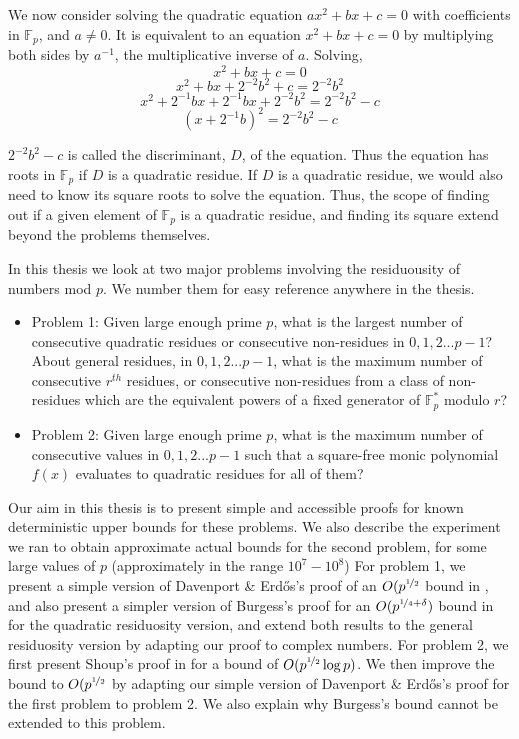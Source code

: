 \documentclass{report}
\begin{document}
We now consider solving the quadratic equation $ax^2+bx+c=0$ with coefficients in $\mathbb{F}_p$, and $a\neq 0$. It is equivalent to an equation $x^2+bx+c=0$ by multiplying both sides by $a^{-1}$, the multiplicative inverse of $a$. Solving,
$$x^2+bx+c=0$$
$$x^2+bx+2^{-2}b^{2}+c=2^{-2}b^{2}$$
$$x^2+2^{-1}bx+2^{-1}bx+2^{-2}b^{2}=2^{-2}b^{2}-c$$
$$(x+2^{-1}b)^2=2^{-2}b^{2}-c$$

$2^{-2}b^{2}-c$ is called the discriminant, $D$, of the equation. Thus the equation has roots in $\mathbb{F}_p$ if $D$ is a quadratic residue. If $D$ is a quadratic residue, we would also need to know its square roots to solve the equation. Thus, the scope of finding out if a given element of $\mathbb{F}_p$ is a quadratic residue, and finding its square extend beyond the problems themselves.

In this thesis we look at two major problems involving the residuousity of numbers mod $p$. We number them for easy reference anywhere in the thesis.
\begin{itemize}
    \item Problem 1: Given large enough prime $p$, what is the largest number of consecutive quadratic residues or consecutive non-residues in $0,1,2...p-1$? About general residues, in $0,1,2...p-1$, what is the maximum number of consecutive $r^{th}$ residues, or consecutive non-residues from a class of non-residues which are the equivalent powers of a fixed generator of $\mathbb{F}^*_p$ modulo $r$?
    \item Problem 2: Given large enough prime $p$, what is the maximum number of consecutive values in $0,1,2...p-1$ such that a square-free monic polynomial $f(x)$ evaluates to quadratic residues for all of them?
\end{itemize}
Our aim in this thesis is to present simple and accessible proofs for known deterministic upper bounds for these problems. We also describe the experiment we ran to obtain approximate actual bounds for the second problem, for some large values of $p$ (approximately in the range $10^7-10^8$)
For problem 1, we present a simple version of Davenport \& Erd\H os's proof of an $O(p^{\nicefrac{1}{2}}$ bound in \cite{davenport}, and also present a simpler version of Burgess's proof for an $O(p^{\nicefrac{1}{4}+\delta})$ bound in \cite{burgess} for the quadratic residuosity version, and extend both results to the general residuosity version by adapting our proof to complex numbers.
For problem 2, we first present Shoup's proof in \cite{shoup} for a bound of $O(p^{\nicefrac{1}{2}}\log p)$. We then improve the bound to $O(p^{\nicefrac{1}{2}}$ by adapting our simple version of Davenport \& Erd\H os's proof for the first problem to problem 2. We also explain why Burgess's bound cannot be extended to this problem.
\end{document}
